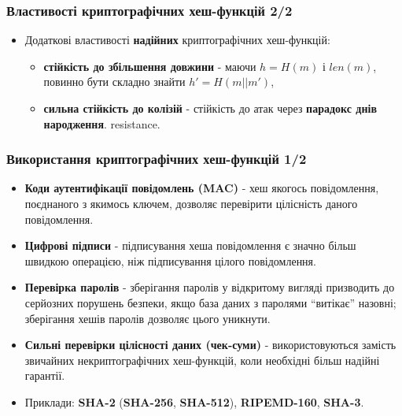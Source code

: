 \documentclass{beamer}
\begin{document}
\begin{frame}
  \frametitle{Властивості криптографічних хеш-функцій 2/2}
  \begin{itemize}
  \item Додаткові властивості \textbf{надійних} криптографічних хеш-функцій:
    \begin{itemize}
    \item \textbf{стійкість до збільшення довжини} - маючи $h = H(m)$ і
      $len(m)$, повинно бути складно знайти $h' = H(m || m')$,
    \item \textbf{сильна стійкість до колізій} - стійкість до атак через
      \textbf{парадокс днів народження}.
      resistance.
    \end{itemize}
  \end{itemize}
\end{frame}

\begin{frame}
  \frametitle{Використання криптографічних хеш-функцій 1/2}
  \begin{itemize}
  \item \textbf{Коди аутентифікації повідомлень (MAC)} - хеш якогось
    повідомлення, поєднаного з якимось ключем, дозволяє перевірити цілісність
    даного повідомлення.
  \item \textbf{Цифрові підписи} - підписування хеша повідомлення є значно більш
    швидкою операцією, ніж підписування цілого повідомлення.
  \item \textbf{Перевірка паролів} - зберігання паролів у відкритому вигляді
    призводить до серйозних порушень безпеки, якщо база даних з паролями ``витікає''
    назовні; зберігання хешів паролів дозволяє цього уникнути.
  \item \textbf{Сильні перевірки цілісності даних (чек-суми)} - використовуються
    замість звичайних некриптографічних хеш-функцій, коли необхідні більш
    надійні гарантії.
  \item Приклади: \textbf{SHA-2} (\textbf{SHA-256}, \textbf{SHA-512}),
    \textbf{RIPEMD-160}, \textbf{SHA-3}.
  \end{itemize}
\end{frame}
\end{document}
